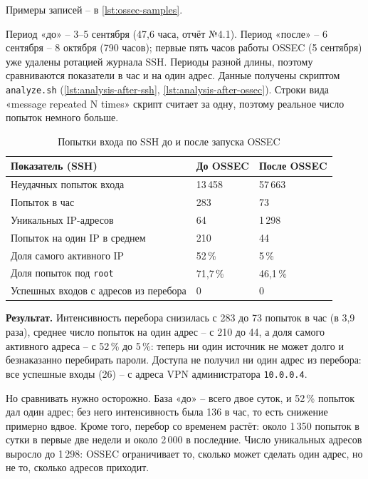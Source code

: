 Примеры записей -- в \autoref{lst:ossec-samples}.



Период «до» -- 3--5 сентября (47,6 часа, отчёт №4.1). Период «после» --
6 сентября -- 8 октября (790 часов); первые пять часов работы OSSEC
(5 сентября) уже удалены ротацией журнала SSH. Периоды разной длины, поэтому
сравниваются показатели в час и на один адрес. Данные получены скриптом
\texttt{analyze.sh} (\autoref{lst:analysis-after-ssh},
\autoref{lst:analysis-after-ossec}). Строки вида «message repeated N times»
скрипт считает за одну, поэтому реальное число попыток немного больше.

\begin{table}[H]
\centering
\small
\begin{tabular}{|p{6.4cm}|p{3.2cm}|p{3.2cm}|}
\hline
\textbf{Показатель (SSH)} & \textbf{До OSSEC} & \textbf{После OSSEC} \\
\hline
Неудачных попыток входа & 13\,458 & 57\,663 \\
\hline
Попыток в час & 283 & 73 \\
\hline
Уникальных IP-адресов & 64 & 1\,298 \\
\hline
Попыток на один IP в среднем & 210 & 44 \\
\hline
Доля самого активного IP & 52\,\% & 5\,\% \\
\hline
Доля попыток под \texttt{root} & 71,7\,\% & 46,1\,\% \\
\hline
Успешных входов с адресов из перебора & 0 & 0 \\
\hline
\end{tabular}
\caption{Попытки входа по SSH до и после запуска OSSEC}
\end{table}

\textbf{Результат.} Интенсивность перебора снизилась с 283 до 73 попыток
в час (в 3,9 раза), среднее число попыток на один адрес -- с 210 до 44,
а доля самого активного адреса -- с 52\,\% до 5\,\%: теперь ни один
источник не может долго и безнаказанно перебирать пароли. Доступа не
получил ни один адрес из перебора: все успешные входы (26) -- с адреса
VPN администратора \texttt{10.0.0.4}.

Но сравнивать нужно осторожно. База «до» -- всего двое суток, и 52\,\%
попыток дал один адрес; без него интенсивность была 136 в час, то есть
снижение примерно вдвое. Кроме того, перебор со временем растёт: около
1\,350 попыток в сутки в первые две недели и около 2\,000 в последние.
Число уникальных адресов выросло до 1\,298: OSSEC ограничивает то,
сколько может сделать один адрес, но не то, сколько адресов приходит.

